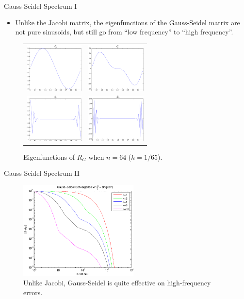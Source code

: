 \documentclass{beamer}
\begin{document}
\begin{frame}{Gauss-Seidel Spectrum I}
 \begin{itemize}
  \item Unlike the Jacobi matrix, the eigenfunctions of the Gauss-Seidel matrix
        are not pure sinusoids, but still go from ``low frequency'' to
        ``high frequency''.
 \end{itemize}
 \begin{figure}
  \begin{tabular}{cc}
   \includegraphics[width=3cm]{images/gauss_v64_1.pdf} & \includegraphics[width=3cm]{images/gauss_v64_2.pdf} \\
   \includegraphics[width=3cm]{images/gauss_v64_31.pdf} & \includegraphics[width=3cm]{images/gauss_v64_64.pdf}
  \end{tabular}
  \caption{Eigenfunctions of $R_G$ when $n=64$ ($h=1/65$).}
 \end{figure}
\end{frame}

\begin{frame}{Gauss-Seidel Spectrum II}
 \begin{figure}
  \includegraphics[width=6cm]{images/gaussConvergence_freq.pdf}
  \caption{Unlike Jacobi, Gauss-Seidel is quite effective on high-frequency
           errors.}
 \end{figure}
\end{frame}
\end{document}
